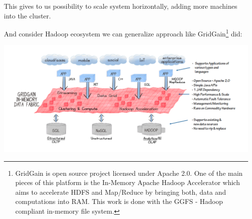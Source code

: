 \documentclass[9pt]{extarticle}
\begin{document}
This gives to us possibility to scale system horizontally, adding more machines
into the cluster.  


And consider Hadoop ecosystem we can generalize approach like GridGain\footnote{
  GridGain is open source project licensed under Apache 2.0. One of the main
  pieces of this platform is the In-Memory Apache Hadoop Accelerator which aims
  to accelerate HDFS and Map/Reduce by bringing both, data and computations into
  RAM. This work is done with the GGFS - Hadoop compliant in-memory file
  system.}
did: 





\begin{center}
\includegraphics[width=\linewidth]{approach}
\end{center}

\vfill



\end{document}
